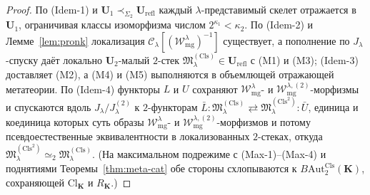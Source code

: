 \documentclass[11pt]{article}
\theoremstyle{plain}
\theoremstyle{definition}
\newcommand{\cC}{\mathcal{C}}
\newcommand{\fM}{\mathfrak{M}}
\newcommand{\Cl}{\mathrm{Cl}}
\begin{document}
\begin{proof}
По \textup{(Idem-1)} и $\mathbf{U}_1 \prec_{\Sigma_2} \mathbf{U}_{\mathrm{refl}}$ каждый $\lambda$-представимый скелет отражается в $\mathbf{U}_1$, ограничивая классы изоморфизма числом $2^{\kappa_1} < \kappa_2$. По \textup{(Idem-2)} и Лемме~\ref{lem:pronk} локализация $\cC_\lambda[(\mathcal{W}_{\mathrm{mg}}^\lambda)^{-1}]$ существует, а пополнение по $J_\lambda$-спуску даёт локально $\mathbf{U}_2$-малый $2$-стек $\fM^{(\mathrm{Cls})}_\lambda \in \mathbf{U}_{\mathrm{refl}}$ с \textup{(M1)} и \textup{(M3)}; \textup{(Idem-3)} доставляет \textup{(M2)}, а \textup{(M4)} и \textup{(M5)} выполняются в объемлющей отражающей метатеории. По \textup{(Idem-4)} функторы $L$ и $U$ сохраняют $\mathcal{W}_{\mathrm{mg}}^\lambda$- и $\mathcal{W}_{\mathrm{mg}}^{\lambda,(2)}$-морфизмы и спускаются вдоль $J_\lambda / J_\lambda^{(2)}$ к $2$-функторам $\bar{L} : \fM^{(\mathrm{Cls})}_\lambda \rightleftarrows \fM^{(\mathrm{Cls}^2)}_\lambda : \bar{U}$, единица и коединица которых суть образы $\mathcal{W}_{\mathrm{mg}}^\lambda$- и $\mathcal{W}_{\mathrm{mg}}^{\lambda,(2)}$-морфизмов и потому псевдоестественные эквивалентности в локализованных $2$-стеках, откуда $\fM^{(\mathrm{Cls}^2)}_\lambda \simeq_2 \fM^{(\mathrm{Cls})}_\lambda$. (На максимальном подрежиме с \textup{(Max-1)--(Max-4)} и поднятиями Теоремы~\ref{thm:meta-cat} обе стороны схлопываются к $B\mathrm{Aut}_2^{\mathrm{Cls}}(\mathbf{K})$, сохраняющей $\Cl_{\mathbf{K}}$ и $R_{\mathbf{K}}$.)
\end{proof}
\end{document}
